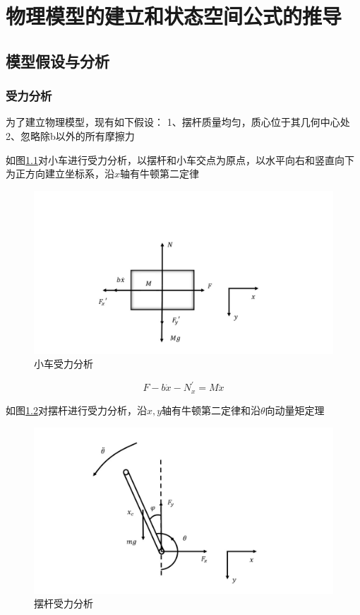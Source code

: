 \chapter{物理模型的建立和状态空间公式的推导}

\section{模型假设与分析}
\subsection{受力分析}
为了建立物理模型，现有如下假设：
1、摆杆质量均匀，质心位于其几何中心处
2、忽略除b以外的所有摩擦力

如图\ref{fig:car}对小车进行受力分析，以摆杆和小车交点为原点，以水平向右和竖直向下为正方向建立坐标系，沿$x$轴有牛顿第二定律

\begin{figure}[hbpt]
\centering
\includegraphics[width=12cm]{car.jpg}
\caption{小车受力分析}\label{fig:car}
\end{figure}


\begin{equation}
F-b\dot x-N_x^{'}=M\ddot x
\end{equation}

如图\ref{fig:stick}对摆杆进行受力分析，沿$x,y$轴有牛顿第二定律和沿$\theta$向动量矩定理

\begin{figure}[hbpt]
\centering
\includegraphics[width=12cm]{stick.jpg}
\caption{摆杆受力分析}\label{fig:stick}
\end{figure}

